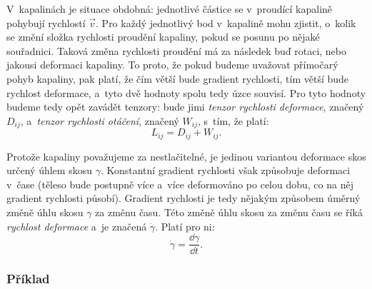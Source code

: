 \documentclass[12pt]{article}
\begin{document}
V~kapalinách je situace obdobná: jednotlivé částice se v~proudící kapalině pohybují rychlostí $\vec v$. Pro každý jednotlivý bod v~kapalině mohu zjistit, o~kolik se změní složka rychlosti proudění kapaliny, pokud se posunu po nějaké souřadnici. Taková změna rychlosti proudění má za následek buď rotaci, nebo jakousi deformaci kapaliny. To proto, že pokud budeme uvažovat přímočarý pohyb kapaliny, pak platí, že čím větší bude gradient rychlosti, tím větší bude rychlost deformace, a~tyto dvě hodnoty spolu tedy úzce souvisí. Pro tyto hodnoty budeme tedy opět zavádět tenzory: bude jimi \emph{tenzor rychlosti deformace}, značený $D_{ij}$, a~\emph{tenzor rychlosti otáčení}, značený $W_{ij}$, s~tím, že platí:~\cite{wiki:Strain_rate_tensor}\cite{wiki:Simple_shear}\cite{Article:Shear_pure_and_simple}
\begin{equation}
    L_{ij} = D_{ij} + W_{ij}\text{.}
    \label{eq:rovnost_tenzoru}
\end{equation}
\par
Protože kapaliny považujeme za nestlačitelné, je jedinou variantou deformace skos určený úhlem skosu $\gamma$. Konstantní gradient rychlosti však způsobuje deformaci v~čase (těleso bude postupně více a~více deformováno po celou dobu, co na něj gradient rychlosti působí). Gradient rychlosti je tedy nějakým způsobem úměrný změně úhlu skosu $\gamma$ za změnu času. Této změně úhlu skosu za změnu času se říká \emph{rychlost deformace} a~je značená $\dot\gamma$. Platí pro ni:
\begin{equation}
    \dot\gamma = \frac{\dd\gamma}{\dd t}\text{.}
    \label{eq:dot_gamma}
\end{equation}

\subsubsection{Příklad}%
\end{document}

